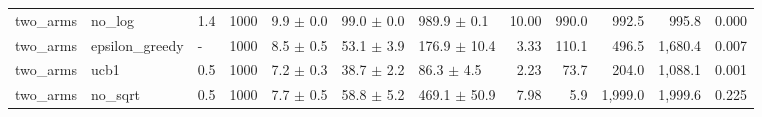\begin{table}[!t]
\begin{tabular}{lllrlllrrrrr}
two\_arms & no\_log & 1.4 & 1000 & 9.9 $\pm$ 0.0 & 99.0 $\pm$ 0.0 & 989.9 $\pm$ 0.1 & 10.00 & 990.0 & 992.5 & 995.8 & 0.000 \\
two\_arms & epsilon\_greedy & - & 1000 & 8.5 $\pm$ 0.5 & 53.1 $\pm$ 3.9 & 176.9 $\pm$ 10.4 & 3.33 & 110.1 & 496.5 & 1,680.4 & 0.007 \\
two\_arms & ucb1 & 0.5 & 1000 & 7.2 $\pm$ 0.3 & 38.7 $\pm$ 2.2 & 86.3 $\pm$ 4.5 & 2.23 & 73.7 & 204.0 & 1,088.1 & 0.001 \\
two\_arms & no\_sqrt & 0.5 & 1000 & 7.7 $\pm$ 0.5 & 58.8 $\pm$ 5.2 & 469.1 $\pm$ 50.9 & 7.98 & 5.9 & 1,999.0 & 1,999.6 & 0.225 \\
\bottomrule
\end{tabular}
\end{table}

